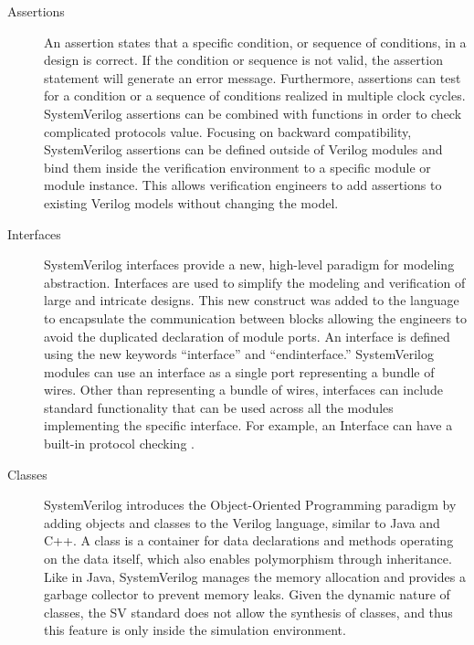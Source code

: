 \begin{description}
    \item[Assertions] An assertion states that a specific condition, or sequence
      of conditions, in a design is correct. If the condition or sequence is not
      valid, the assertion statement will generate an error message.
      Furthermore, assertions can test for a condition or a sequence of
      conditions realized in multiple clock cycles. SystemVerilog assertions can
      be combined with functions in order to check complicated protocols value.
      Focusing on backward compatibility, SystemVerilog assertions can be
      defined outside of Verilog modules and bind them inside the verification
      environment to a specific module or module instance. This allows
      verification engineers to add assertions to existing Verilog models
      without changing the model.
    
    \item[Interfaces] SystemVerilog interfaces provide a new, high-level
      paradigm for modeling abstraction. Interfaces are used to simplify the
      modeling and verification of large and intricate designs. This new
      construct was added to the language to encapsulate the communication
      between blocks allowing the engineers to avoid the duplicated declaration
      of module ports. An interface is defined using the new keywords
      ``interface” and ``endinterface.” SystemVerilog modules can use an
      interface as a single port representing a bundle of wires. Other than
      representing a bundle of wires, interfaces can include standard
      functionality that can be used across all the modules implementing the
      specific interface. For example, an Interface can have a built-in protocol
      checking \cite{sutherland2003overview}.
    
    \item[Classes] SystemVerilog introduces the Object-Oriented Programming
      paradigm by \hfill \break adding objects and classes to the Verilog
      language, similar to Java and C++. A class is a container for data
      declarations and methods operating on the data itself, which also enables
      polymorphism through inheritance. Like in Java, SystemVerilog manages the
      memory allocation and provides a garbage collector to prevent memory
      leaks. Given the dynamic nature of classes, the SV standard does not allow
      the synthesis of classes, and thus this feature is only inside the
      simulation environment.
    

\end{description}
